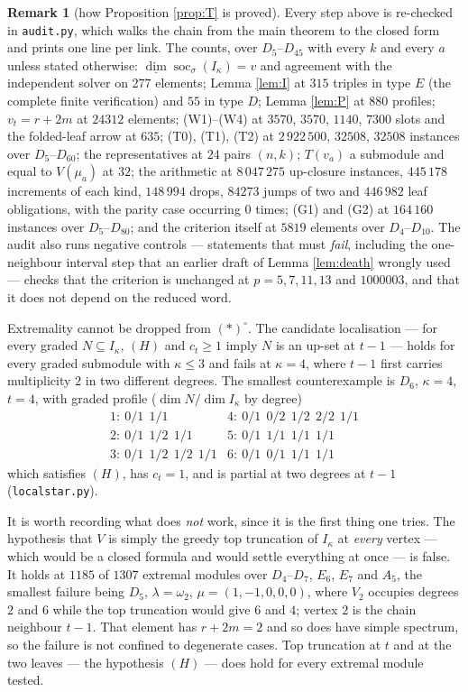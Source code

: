 \documentclass[11pt,reqno]{amsart}
\theoremstyle{plain}
\theoremstyle{definition}
\newtheorem{remark}[theorem]{Remark}
\DeclareMathOperator{\soc}{soc}
\newcommand{\dimv}{\underline{\dim}}
\newcommand{\om}{\omega}
\newcommand{\la}{\lambda}
\newcommand{\ka}{\kappa}
\begin{document}
\begin{remark}[how Proposition \ref{prop:T} is proved]
Every step above is re-checked in \texttt{audit.py}, which walks the chain from
the main theorem to the closed form and prints one line per link.  The counts,
over $D_5$--$D_{45}$ with every $k$ and every $a$ unless stated otherwise:
$\dimv\soc_\sigma(I_\ka)=v$ and agreement with the independent solver on $277$
elements; Lemma \ref{lem:I} at $315$ triples in type $E$ (the complete finite
verification) and $55$ in type $D$; Lemma \ref{lem:P} at $880$ profiles;
$v_t=r+2m$ at $24312$ elements; (W1)--(W4) at $3570$, $3570$, $1140$, $7300$
slots and the folded-leaf arrow at $635$; (T0), (T1), (T2) at $2\,922\,500$,
$32508$, $32508$ instances over $D_5$--$D_{60}$; the representatives at $24$
pairs $(n,k)$; $T(v_a)$ a submodule and equal to $V(\mu_a)$ at $32$; the
arithmetic at $8\,047\,275$ up-closure instances, $445\,178$ increments of each
kind, $148\,994$ drops, $84273$ jumps of two and $446\,982$ leaf obligations,
with the parity case occurring $0$ times; (G1) and (G2) at $164\,160$ instances
over $D_5$--$D_{80}$; and the criterion itself at $5819$ elements over
$D_4$--$D_{10}$.  The audit also runs negative controls --- statements that must
\emph{fail}, including the one-neighbour interval step that an earlier draft of
Lemma \ref{lem:death} wrongly used --- checks that the criterion is unchanged at
$p=5,7,11,13$ and $1000003$, and that it does not depend on the reduced word.

Extremality cannot be dropped from $(*)^{\circ}$.  The candidate localisation
--- for every graded $N\subseteq I_\ka$, $(H)$ and $c_t\ge1$ imply $N$ is an
up-set at $t-1$ --- holds for every graded submodule with $\ka\le3$ and fails
at $\ka=4$, where $t-1$ first carries multiplicity $2$ in two different
degrees.  The smallest counterexample is $D_6$, $\ka=4$, $t=4$, with graded
profile ($\dim N/\dim I_\ka$ by degree)
\[
\begin{array}{ll}
 1:\ 0/1\ \ 1/1 &
 4:\ 0/1\ \ 0/2\ \ 1/2\ \ 2/2\ \ 1/1\\
 2:\ 0/1\ \ 1/2\ \ 1/1 &
 5:\ 0/1\ \ 1/1\ \ 1/1\ \ 1/1\\
 3:\ 0/1\ \ 1/2\ \ 1/2\ \ 1/1 &
 6:\ 0/1\ \ 0/1\ \ 1/1\ \ 1/1
\end{array}
\]
which satisfies $(H)$, has $c_t=1$, and is partial at two degrees at $t-1$
(\texttt{localstar.py}).

It is worth recording what does \emph{not} work, since it is the first thing
one tries.  The hypothesis that $V$ is simply the greedy top truncation of
$I_\ka$ at \emph{every} vertex --- which would be a closed formula and would
settle everything at once --- is false.  It holds at $1185$ of $1307$ extremal
modules over $D_4$--$D_7$, $E_6$, $E_7$ and $A_5$, the smallest failure being
$D_5$, $\la=\om_2$, $\mu=(1,-1,0,0,0)$, where $V_2$ occupies degrees $2$ and
$6$ while the top truncation would give $6$ and $4$; vertex $2$ is the chain
neighbour $t-1$.  That element has $r+2m=2$ and so does have simple spectrum,
so the failure is not confined to degenerate cases.  Top truncation at $t$ and
at the two leaves --- the hypothesis $(H)$ --- does hold for every extremal
module tested.


\end{remark}
\end{document}
